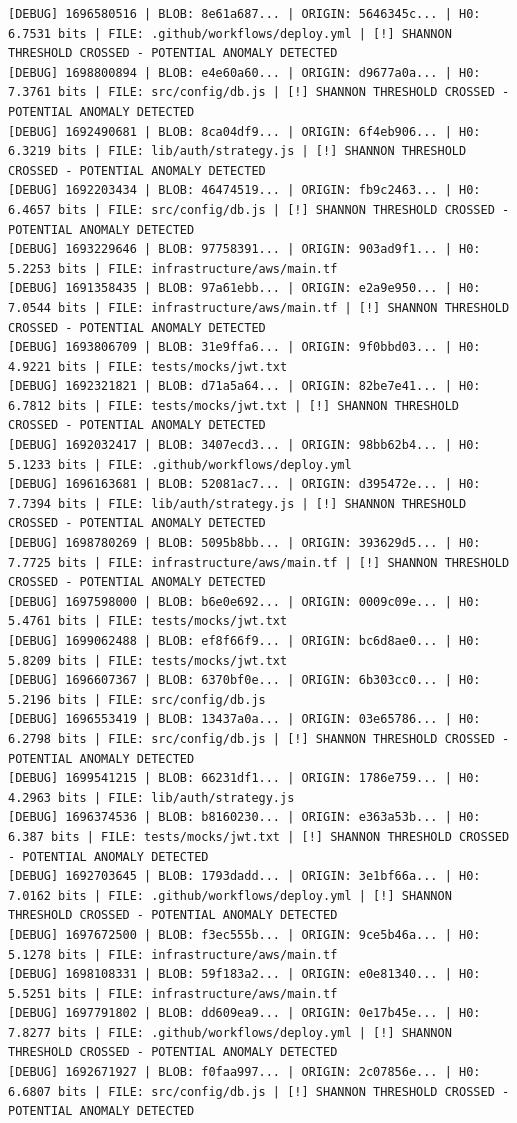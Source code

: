 \documentclass[12pt, a4paper, oneside]{report}
\begin{document}
\begin{lstlisting}[basicstyle=\tiny\ttfamily]
[DEBUG] 1696580516 | BLOB: 8e61a687... | ORIGIN: 5646345c... | H0: 6.7531 bits | FILE: .github/workflows/deploy.yml | [!] SHANNON THRESHOLD CROSSED - POTENTIAL ANOMALY DETECTED
[DEBUG] 1698800894 | BLOB: e4e60a60... | ORIGIN: d9677a0a... | H0: 7.3761 bits | FILE: src/config/db.js | [!] SHANNON THRESHOLD CROSSED - POTENTIAL ANOMALY DETECTED
[DEBUG] 1692490681 | BLOB: 8ca04df9... | ORIGIN: 6f4eb906... | H0: 6.3219 bits | FILE: lib/auth/strategy.js | [!] SHANNON THRESHOLD CROSSED - POTENTIAL ANOMALY DETECTED
[DEBUG] 1692203434 | BLOB: 46474519... | ORIGIN: fb9c2463... | H0: 6.4657 bits | FILE: src/config/db.js | [!] SHANNON THRESHOLD CROSSED - POTENTIAL ANOMALY DETECTED
[DEBUG] 1693229646 | BLOB: 97758391... | ORIGIN: 903ad9f1... | H0: 5.2253 bits | FILE: infrastructure/aws/main.tf
[DEBUG] 1691358435 | BLOB: 97a61ebb... | ORIGIN: e2a9e950... | H0: 7.0544 bits | FILE: infrastructure/aws/main.tf | [!] SHANNON THRESHOLD CROSSED - POTENTIAL ANOMALY DETECTED
[DEBUG] 1693806709 | BLOB: 31e9ffa6... | ORIGIN: 9f0bbd03... | H0: 4.9221 bits | FILE: tests/mocks/jwt.txt
[DEBUG] 1692321821 | BLOB: d71a5a64... | ORIGIN: 82be7e41... | H0: 6.7812 bits | FILE: tests/mocks/jwt.txt | [!] SHANNON THRESHOLD CROSSED - POTENTIAL ANOMALY DETECTED
[DEBUG] 1692032417 | BLOB: 3407ecd3... | ORIGIN: 98bb62b4... | H0: 5.1233 bits | FILE: .github/workflows/deploy.yml
[DEBUG] 1696163681 | BLOB: 52081ac7... | ORIGIN: d395472e... | H0: 7.7394 bits | FILE: lib/auth/strategy.js | [!] SHANNON THRESHOLD CROSSED - POTENTIAL ANOMALY DETECTED
[DEBUG] 1698780269 | BLOB: 5095b8bb... | ORIGIN: 393629d5... | H0: 7.7725 bits | FILE: infrastructure/aws/main.tf | [!] SHANNON THRESHOLD CROSSED - POTENTIAL ANOMALY DETECTED
[DEBUG] 1697598000 | BLOB: b6e0e692... | ORIGIN: 0009c09e... | H0: 5.4761 bits | FILE: tests/mocks/jwt.txt
[DEBUG] 1699062488 | BLOB: ef8f66f9... | ORIGIN: bc6d8ae0... | H0: 5.8209 bits | FILE: tests/mocks/jwt.txt
[DEBUG] 1696607367 | BLOB: 6370bf0e... | ORIGIN: 6b303cc0... | H0: 5.2196 bits | FILE: src/config/db.js
[DEBUG] 1696553419 | BLOB: 13437a0a... | ORIGIN: 03e65786... | H0: 6.2798 bits | FILE: src/config/db.js | [!] SHANNON THRESHOLD CROSSED - POTENTIAL ANOMALY DETECTED
[DEBUG] 1699541215 | BLOB: 66231df1... | ORIGIN: 1786e759... | H0: 4.2963 bits | FILE: lib/auth/strategy.js
[DEBUG] 1696374536 | BLOB: b8160230... | ORIGIN: e363a53b... | H0: 6.387 bits | FILE: tests/mocks/jwt.txt | [!] SHANNON THRESHOLD CROSSED - POTENTIAL ANOMALY DETECTED
[DEBUG] 1692703645 | BLOB: 1793dadd... | ORIGIN: 3e1bf66a... | H0: 7.0162 bits | FILE: .github/workflows/deploy.yml | [!] SHANNON THRESHOLD CROSSED - POTENTIAL ANOMALY DETECTED
[DEBUG] 1697672500 | BLOB: f3ec555b... | ORIGIN: 9ce5b46a... | H0: 5.1278 bits | FILE: infrastructure/aws/main.tf
[DEBUG] 1698108331 | BLOB: 59f183a2... | ORIGIN: e0e81340... | H0: 5.5251 bits | FILE: infrastructure/aws/main.tf
[DEBUG] 1697791802 | BLOB: dd609ea9... | ORIGIN: 0e17b45e... | H0: 7.8277 bits | FILE: .github/workflows/deploy.yml | [!] SHANNON THRESHOLD CROSSED - POTENTIAL ANOMALY DETECTED
[DEBUG] 1692671927 | BLOB: f0faa997... | ORIGIN: 2c07856e... | H0: 6.6807 bits | FILE: src/config/db.js | [!] SHANNON THRESHOLD CROSSED - POTENTIAL ANOMALY DETECTED
\end{lstlisting}
\end{document}
